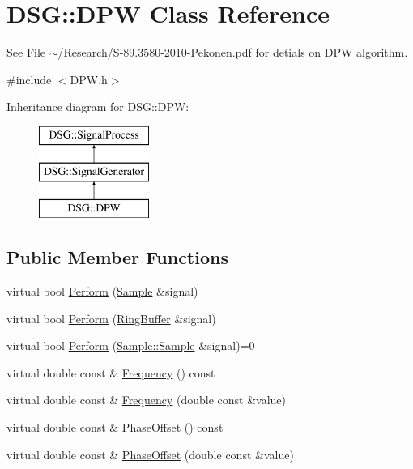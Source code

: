 \hypertarget{classDSG_1_1DPW}{\section{D\+S\+G\+:\+:D\+P\+W Class Reference}
\label{classDSG_1_1DPW}
}


See File $\sim$/\+Research/\+S-\/89.3580-\/2010-\/\+Pekonen.\+pdf for detials on \hyperlink{classDSG_1_1DPW}{D\+P\+W} algorithm.  




{\ttfamily \#include $<$D\+P\+W.\+h$>$}

Inheritance diagram for D\+S\+G\+:\+:D\+P\+W\+:\begin{figure}[H]
\begin{center}
\leavevmode
\includegraphics[height=3.000000cm]{classDSG_1_1DPW}
\end{center}
\end{figure}
\subsection*{Public Member Functions}
\begin{DoxyCompactItemize}
\item 
virtual bool \hyperlink{classDSG_1_1SignalGenerator_a95d485b68d874938ac93644b121607b9}{Perform} (\hyperlink{classDSG_1_1Sample}{Sample} \&signal)
\item 
virtual bool \hyperlink{classDSG_1_1SignalGenerator_abaa9aecd00b792d46166b91524b42db6}{Perform} (\hyperlink{classDSG_1_1RingBuffer}{Ring\+Buffer} \&signal)
\item 
virtual bool \hyperlink{classDSG_1_1SignalProcess_afdb8220100418893950c1161dd24db67}{Perform} (\hyperlink{classDSG_1_1Sample_aaf2e30d73911eccea99b53eeee15b612}{Sample\+::\+Sample} \&signal)=0
\item 
virtual double const \& \hyperlink{classDSG_1_1SignalGenerator_aedac746c5a70818d120858542ecb7c45}{Frequency} () const 
\item 
virtual double const \& \hyperlink{classDSG_1_1SignalGenerator_ae3ce8d45bafabbd86a0f535b15c3cd46}{Frequency} (double const \&value)
\item 
virtual double const \& \hyperlink{classDSG_1_1SignalGenerator_a1ce521847edd0b837fd840998f906b4b}{Phase\+Offset} () const 
\item 
virtual double const \& \hyperlink{classDSG_1_1SignalGenerator_a08b71b1f30ba65e629642c570291dc0e}{Phase\+Offset} (double const \&value)
\end{DoxyCompactItemize}
